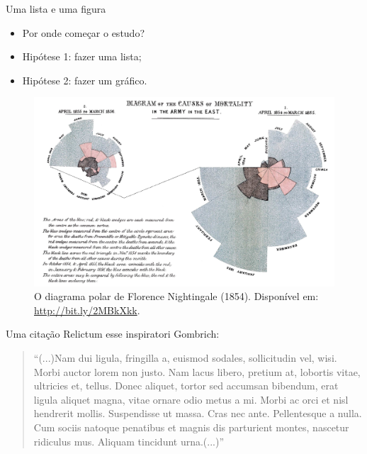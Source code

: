 \documentclass[aspectratio=169]{beamer}
\begin{document}
\begin{frame}{Uma lista e uma figura}
\begin{minipage}{0.47\textwidth}
\begin{itemize}
\item Por onde começar o estudo?
\item Hipótese 1: fazer uma lista;
\item Hipótese 2: fazer um gráfico.
\end{itemize}
\end{minipage}
\begin{minipage}{0.5\textwidth}
\begin{figure}
\includegraphics[scale=0.4]{figuras/rose-diagram.png}
\caption{O diagrama polar de Florence Nightingale (1854). Disponível em: \url{http://bit.ly/2MBkXkk}.}
\end{figure}
\end{minipage}
\end{frame}

\begin{frame}{Uma citação}
Relictum esse inspiratori Gombrich: 
\begin{quotation}
	``(...)Nam dui ligula, fringilla a, euismod sodales, sollicitudin vel, wisi. Morbi auctor lorem non justo. Nam lacus libero, pretium at, lobortis vitae, ultricies et, tellus. Donec aliquet, tortor sed accumsan bibendum, erat ligula aliquet magna, vitae ornare odio metus a mi. Morbi ac orci et nisl hendrerit mollis. Suspendisse ut massa. Cras nec ante. Pellentesque a nulla. Cum sociis natoque penatibus et magnis dis parturient montes, nascetur ridiculus mus. Aliquam tincidunt urna.(...)''\cite{gombrich} 
\end{quotation}

\end{frame}
\end{document}
